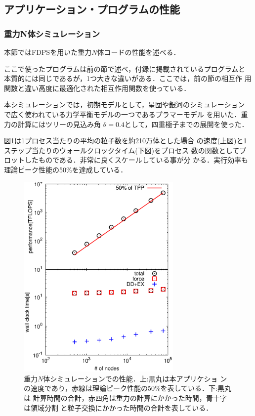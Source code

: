 \documentclass[submit,techreq,noauthor]{ipsj}
\begin{document}
\subsection{アプリケーション・プログラムの性能}

\subsubsection{重力N体シミュレーション}

本節ではFDPSを用いた重力$N$体コードの性能を述べる．

ここで使ったプログラムは前の節で述べ，付録に掲載されているプログラムと
本質的には同じであるが，1つ大きな違いがある．ここでは，前の節の相互作
用関数と違い高度に最適化された相互作用関数を使っている．

本シミュレーションでは，初期モデルとして，星団や銀河のシミュレーション
で広く使われている力学平衡モデルの一つであるプラマーモデル
\cite{1911MNRAS..71..460P}を用いた．重力の計算にはツリーの見込み角
$\theta = 0.4$として，四重極子までの展開を使った．

図\ref{fig:bench}は1プロセス当たりの平均の粒子数を約210万体とした場合
の速度(上図)と1ステップ当たりのウォールクロックタイム(下図)をプロセス
数の関数としてプロットしたものである．非常に良くスケールしている事が分
かる．実行効率も理論ピーク性能の50\%を達成している．

\begin{figure}[!h]
  \begin{center}
    \includegraphics[width=8cm]{bench_nbody.eps}
  \end{center}
  \caption{重力$N$体シミュレーションでの性能．上:黒丸は本アプリケショ
    ンの速度であり，赤線は理論ピーク性能の50\%を表している．下:黒丸は
    計算時間の合計，赤四角は重力の計算にかかった時間，青十字は領域分割
    と粒子交換にかかった時間の合計を表している．}
  \label{fig:bench}
\end{figure}
\end{document}
